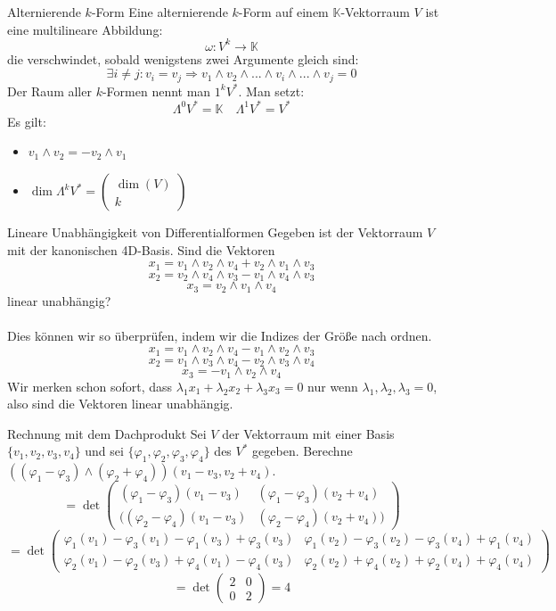 \begin{Def}{Alternierende $k$-Form}
    Eine alternierende $k$-Form auf einem $\mathbb{K}$-Vektorraum $V$ ist eine multilineare Abbildung:
    $$\omega: V^k \rightarrow \mathbb{K}$$
    die verschwindet, sobald wenigstens zwei Argumente gleich sind:
    $$\exists i\neq j: v_i = v_j \Rightarrow   v_1\land v_2\land ... \land v_i \land ... \land v_j=0$$
    Der Raum aller $k$-Formen nennt man $1^kV^*$. Man setzt:
    $$\Lambda^0V^*=\mathbb{K} \quad \Lambda^1V^*=V^*$$
    Es gilt:
    \begin{itemize}
        \item $v_1\land v_2 = -v_2\land v_1$
        \item $\dim \Lambda^k V^* = \begin{pmatrix}
            \dim(V) \\ k
        \end{pmatrix}$
    \end{itemize}
\end{Def}
\begin{Beispiel}{Lineare Unabhängigkeit von Differentialformen}
Gegeben ist der Vektorraum $V$ mit der kanonischen 4D-Basis. Sind die Vektoren
$$x_1=v_1\land v_2\land v_4+ v_2\land v_1\land v_3$$
$$x_2=v_2\land v_4\land v_3 - v_1\land v_4\land v_3$$
$$x_3=v_2\land v_1 \land v_4$$
linear unabhängig? \\ \\
Dies können wir so überprüfen, indem wir die Indizes der Größe nach ordnen.
$$x_1=v_1\land v_2\land v_4- v_1\land v_2\land v_3$$
    $$x_2=v_1\land v_3\land v_4-v_2\land v_3\land v_4$$
$$x_3=-v_1\land v_2 \land v_4$$
Wir merken schon sofort, dass $\lambda_1 x_1+\lambda_2 x_2+\lambda_3 x_3=0$ nur wenn $\lambda_1, \lambda_2, \lambda_3 = 0$, also sind die Vektoren linear unabhängig.
\end{Beispiel}
\begin{Beispiel}{Rechnung mit dem Dachprodukt}
    Sei $V$ der Vektorraum mit einer Basis $\{v_1, v_2, v_3, v_4\}$ und sei $\{\varphi_1, \varphi_2, \varphi_3, \varphi_4\}$ des $V^*$ gegeben. Berechne 
    $((\varphi_1-\varphi_3)\land(\varphi_2+\varphi_4))(v_1-v_3, v_2+v_4)$.
    $$=\det\begin{pmatrix}
        (\varphi_1-\varphi_3)(v_1-v_3) & (\varphi_1-\varphi_3)(v_2+v_4) \\
        ((\varphi_2-\varphi_4)(v_1-v_3) & (\varphi_2-\varphi_4)(v_2+v_4))
    \end{pmatrix}$$
    $$=\det\begin{pmatrix}
        \varphi_1(v_1)-\varphi_3(v_1)-\varphi_1(v_3)+\varphi_3(v_3) & \varphi_1(v_2)-\varphi_3(v_2)-\varphi_3(v_4)+\varphi_1(v_4) \\
        \varphi_2(v_1)-\varphi_2(v_3)+\varphi_4(v_1)-\varphi_4(v_3) & \varphi_2(v_2)+\varphi_4(v_2)+\varphi_2(v_4)+\varphi_4(v_4)
    \end{pmatrix}$$
    $$=\det\begin{pmatrix}
        2 & 0 \\
        0 & 2
    \end{pmatrix}=4$$
\end{Beispiel}
